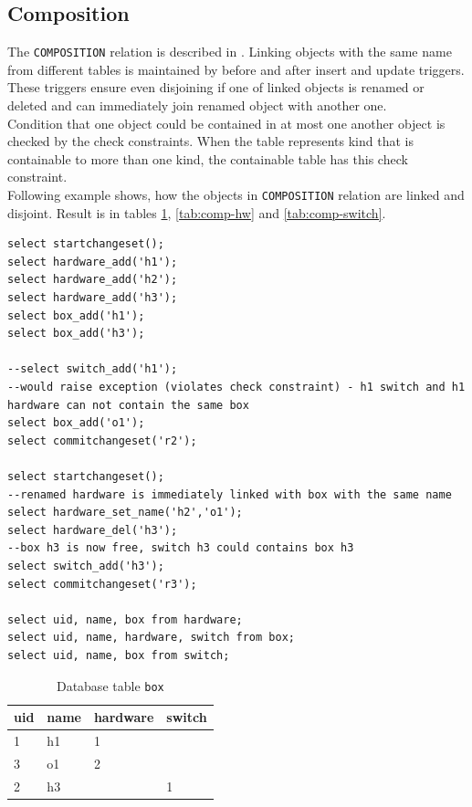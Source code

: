 \documentclass[deska]{subfiles}
\begin{document}
\subsection{Composition}
The {\tt COMPOSITION} relation is described in .
Linking objects with the same name from different tables is maintained by before and after insert and update triggers. These triggers ensure even disjoining if one of linked objects is renamed or deleted and can immediately join renamed object with another one.\\
Condition that one object could be contained in at most one another object is checked by the check constraints. When the table represents kind that is containable to more than one kind, the containable table has this check constraint.\\
Following example shows, how the objects in {\tt COMPOSITION} relation are linked and disjoint. Result is in tables \ref{tab:comp-box}, \ref{tab:comp-hw} and \ref{tab:comp-switch}.

\begin{verbatim}
select startchangeset();
select hardware_add('h1');
select hardware_add('h2');
select hardware_add('h3');
select box_add('h1');
select box_add('h3');

--select switch_add('h1');
--would raise exception (violates check constraint) - h1 switch and h1 hardware can not contain the same box
select box_add('o1');
select commitchangeset('r2');

select startchangeset();
--renamed hardware is immediately linked with box with the same name
select hardware_set_name('h2','o1');
select hardware_del('h3');
--box h3 is now free, switch h3 could contains box h3
select switch_add('h3');
select commitchangeset('r3');

select uid, name, box from hardware;
select uid, name, hardware, switch from box;
select uid, name, box from switch;
\end{verbatim}

\begin{longtable}{ l | l | l | l }
    \caption{Database table {\tt box}}\\
    uid & name & hardware & switch\\
    \hline
    \endhead
\label{tab:comp-box}
    1 & h1 & 1 & \\
    3 & o1 & 2 & \\
    2 & h3 &  & 1\\
    \hline
\end{longtable}
\end{document}
